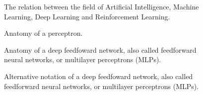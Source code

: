 \documentclass{book}
\begin{document}
    \begin{figure}[!htp]
        \centering
        
        \caption{
            The relation between the field of Artificial Intelligence,
            Machine Learning, Deep Learning and Reinforcement Learning.
        }
        \label{fig:al-ml-dl}
    \end{figure}

    \begin{figure}[!htp]
        \centering
        
        \caption{Anatomy of a perceptron.}
        \label{fig:perceptron}
    \end{figure}

    \begin{figure}[!htp]
        \centering
        
        \caption{Anatomy of a deep feedfoward network, also called feedforward neural networks, or multilayer perceptrons (MLPs).}
        \label{fig:mlp}
    \end{figure}

    \begin{figure}[!htp]
        \centering
        
        \caption{Alternative notation of a deep feedfoward network, also called feedforward neural networks, or multilayer perceptrons (MLPs).}
        \label{fig:mlp-vec}
    \end{figure}

    
    
    
\end{document}
